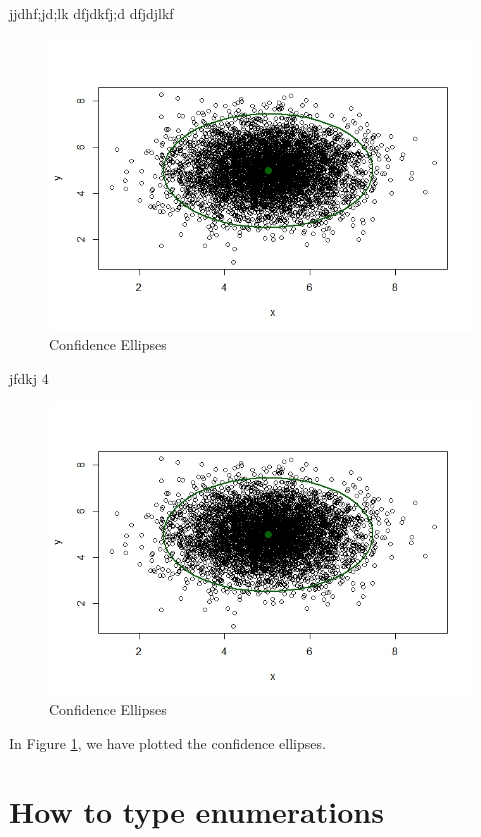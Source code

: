 \documentclass[12pt,a4paper,oneside]{book}
\begin{document}
jjdhf;jd;lk
dfjdkfj;d
dfjdjlkf


\begin{figure}[htb!]
	\centering
	\includegraphics[scale=.5]{images/Rplot}
	\caption{Confidence Ellipses}
\end{figure}


jfdkj
4

\begin{figure}[htb!]
	\centering
\includegraphics[scale=.5]{images/Rplot}
\caption{Confidence Ellipses}
\label{fig:conf_ellipse}
\end{figure}


In Figure \ref{fig:conf_ellipse}, we have plotted the confidence ellipses. 

\clearpage 
\section{How to type enumerations}
\end{document}
